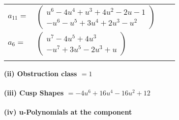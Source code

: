\documentclass[1p]{elsarticle_modified}
\theoremstyle{definition}
\begin{document}
\begin{tabular}{m{7pt} m{180pt} m{7pt} m{180pt} }
\flushright $a_{11}=$&$\begin{pmatrix}u^6-4 u^4+u^3+4 u^2-2 u-1\\- u^6- u^5+3 u^4+2 u^3- u^2\end{pmatrix}$ \\
\flushright $a_{6}=$&$\begin{pmatrix}u^7-4 u^5+4 u^3\\- u^7+3 u^5-2 u^3+u\end{pmatrix}$\\&\end{tabular}
\flushleft \textbf{(ii) Obstruction class $= 1$}\\~\\
\flushleft \textbf{(iii) Cusp Shapes $= -4 u^6+16 u^4-16 u^2+12$}\\~\\
\newpage\renewcommand{\arraystretch}{1}
\flushleft \textbf{(iv) u-Polynomials at the component}\newline \\
\end{document}
